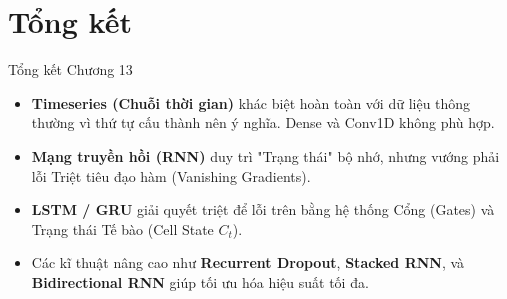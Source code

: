 \documentclass[aspectratio=169]{beamer}
\begin{document}
\section{Tổng kết}

\begin{frame}{Tổng kết Chương 13}
    \begin{itemize}
        \item \textbf{Timeseries (Chuỗi thời gian)} khác biệt hoàn toàn với dữ liệu thông thường vì thứ tự cấu thành nên ý nghĩa. Dense và Conv1D không phù hợp.
        \item \textbf{Mạng truyền hồi (RNN)} duy trì "Trạng thái" bộ nhớ, nhưng vướng phải lỗi Triệt tiêu đạo hàm (Vanishing Gradients).
        \item \textbf{LSTM / GRU} giải quyết triệt để lỗi trên bằng hệ thống Cổng (Gates) và Trạng thái Tế bào (Cell State $C_t$).
        \item Các kĩ thuật nâng cao như \textbf{Recurrent Dropout}, \textbf{Stacked RNN}, và \textbf{Bidirectional RNN} giúp tối ưu hóa hiệu suất tối đa.
    \end{itemize}
\end{frame}
\end{document}
